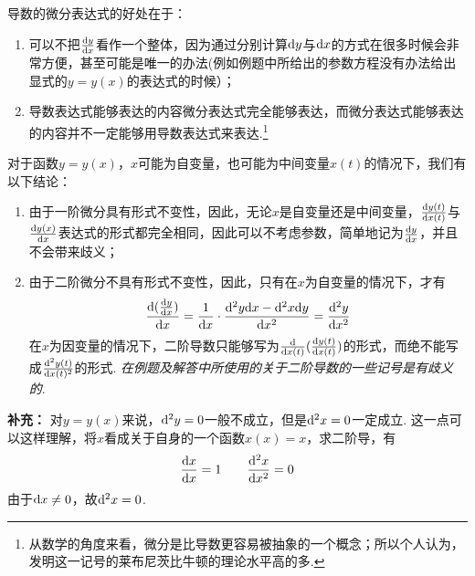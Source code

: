 	\rmk 导数的微分表达式的好处在于：
	\begin{enumerate}
		\item 可以不把$\frac{\mathrm{d} y}{\mathrm{d} x}$看作一个整体，因为通过分别计算$\mathrm{d} y$与$\mathrm{d} x$的方式在很多时候会非常方便，甚至可能是唯一的办法(例如例题中所给出的参数方程没有办法给出显式的$y=y(x)$的表达式的时候）；
		\item 导数表达式能够表达的内容微分表达式完全能够表达，而微分表达式能够表达的内容并不一定能够用导数表达式来表达.\footnote{从数学的角度来看，微分是比导数更容易被抽象的一个概念；所以个人认为，发明这一记号的莱布尼茨比牛顿的理论水平高的多.}
	\end{enumerate}

	\rmk 对于函数$y=y(x)$，$x$可能为自变量，也可能为中间变量$x(t)$的情况下，我们有以下结论：
	\begin{enumerate}
		\item 由于一阶微分具有形式不变性，因此，无论$x$是自变量还是中间变量，$\frac{\mathrm{d} y(t)}{\mathrm{d} x(t)}$与$\frac{\mathrm{d} y(x)}{\mathrm{d} x}$表达式的形式都完全相同，因此可以不考虑参数，简单地记为$\frac{\mathrm{d} y}{\mathrm{d} x}$，并且不会带来歧义；
		\item 由于二阶微分不具有形式不变性，因此，只有在$x$为自变量的情况下，才有$$\frac{\mathrm{d}(\frac{\mathrm{d} y}{\mathrm{d} x})}{\mathrm{d} x}= \frac{1}{\mathrm{d} x}\cdot\frac{\mathrm{d}^2 y\mathrm{d} x - \mathrm{d}^2 x\mathrm{d} y}{\mathrm{d} x^2} = \frac{\mathrm{d}^2 y}{\mathrm{d} x^2}$$
		在$x$为因变量的情况下，二阶导数只能够写为$\frac{\mathrm{d}}{\mathrm{d} x(t)}(\frac{\mathrm{d} y(t)}{\mathrm{d} x(t)})$的形式，而绝不能写成$\frac{\mathrm{d}^2 y(t)}{\mathrm{d} x(t)^2}$的形式. \emph{在例题及解答中所使用的关于二阶导数的一些记号是有歧义的}.
	\end{enumerate}

\textbf{补充：} 对$y=y(x)$来说，$\mathrm{d}^2 y=0$一般不成立，但是$\mathrm{d}^2 x =0$一定成立. 这一点可以这样理解，将$x$看成关于自身的一个函数$x(x) = x$，求二阶导，有$$
\frac{\mathrm{d} x}{\mathrm{d} x} = 1 \qquad \frac{\mathrm{d}^2 x}{\mathrm{d} x^2} =0$$ 由于$\mathrm{d} x \neq 0$，故$\mathrm{d}^2 x =0$.
